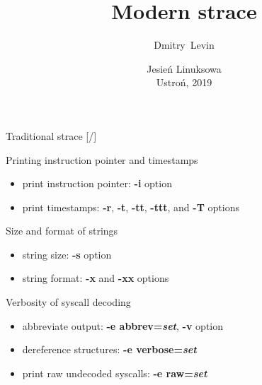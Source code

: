\documentclass[unicode,aspectratio=169]{beamer}
\title{\Huge Modern strace}
\author{\Huge Dmitry~Levin}
\date{\Large Jesień Linuksowa \\ Ustroń, 2019}
\begin{document}
\begin{frame}
\titlepage
\end{frame}

\begin{frame}{Traditional strace \hfill [\insertframenumber/\inserttotalframenumber]}
\large
\begin{block}{Printing instruction pointer and timestamps}
\begin{itemize}
\item print instruction pointer: \textbf{-i} option
\item print timestamps: \textbf{-r}, \textbf{-t}, \textbf{-tt}, \textbf{-ttt}, and \textbf{-T} options
\end{itemize}
\end{block}

\begin{block}{Size and format of strings}
\begin{itemize}
\item string size: \textbf{-s} option
\item string format: \textbf{-x} and \textbf{-xx} options
\end{itemize}
\end{block}

\begin{block}{Verbosity of syscall decoding}
\begin{itemize}
\item abbreviate output: \textbf{-e abbrev=\textit{set}}, \textbf{-v} option
\item dereference structures: \textbf{-e verbose=\textit{set}}
\item print raw undecoded syscalls: \textbf{-e raw=\textit{set}}
\end{itemize}
\end{block}
\end{frame}
\end{document}
